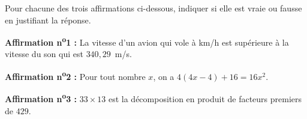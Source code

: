 \documentclass[exercice,a4]{thedocument}%
\begin{document}
%
\def\no{n\textsuperscript{o}}%

\medskip

Pour chacune des trois affirmations ci-dessous, indiquer si elle est vraie ou fausse en justifiant la réponse.

\medskip

\textbf{Affirmation \no 1 :} La vitesse d'un avion qui vole à  km/h est supérieure à la vitesse du son qui est $340,29$~m/s.

\smallskip

\textbf{Affirmation \no 2 :} Pour tout nombre $x$, on a $4(4x - 4) + 16 = 16 x^2$.

\smallskip

\textbf{Affirmation \no 3 :}  $33 \times 13$ est la décomposition en produit de facteurs premiers de $429$.

\bigskip

\showthesource
\end{document}
